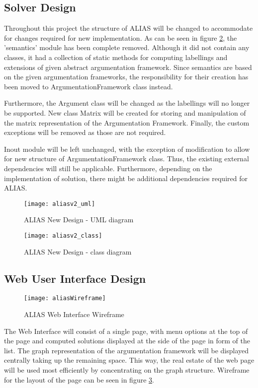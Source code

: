 \subsection{Solver Design}
Throughout this project the structure of ALIAS will be changed to accommodate for changes required for new implementation. As can be seen in figure \ref{fig:aliasUml2}, the 'semantics' module has been complete removed. Although it did not contain any classes, it had a collection of static methods for computing labellings and extensions of given abstract argumentation framework. Since semantics are based on the given argumentation frameworks, the responsibility for their creation has been moved to ArgumentationFramework class instead. 

Furthermore, the Argument class will be changed as the labellings will no longer be supported. New class Matrix will be created for storing and manipulation of the matrix representation of the Argumentation Framework. Finally, the custom exceptions will be removed as those are not required.

Inout module will be left unchanged, with the exception of modification to allow for new structure of ArgumentationFramework class. Thus, the existing external dependencies will still be applicable. Furthermore, depending on the implementation of solution, there might be additional dependencies required for ALIAS.

\begin{figure}[h]
	\texttt{[image: aliasv2\_uml]}
	\caption{ALIAS New Design - UML diagram}
	\label{fig:aliasUml2}
\end{figure}

\begin{figure}[h]
	\texttt{[image: aliasv2\_class]}
	\caption{ALIAS New Design - class diagram}
	\label{fig:aliasUml2}
\end{figure}

\subsection{Web User Interface Design}
\begin{figure}[h]
	\texttt{[image: aliasWireframe]}
	\caption{ALIAS Web Interface Wireframe}
	\label{fig:aliasWireframe}
\end{figure}
The Web Interface will consist of a single page, with menu options at the top of the page and computed solutions displayed at the side of the page in form of the list. The graph representation of the argumentation framework will be displayed centrally taking up the remaining space. This way, the real estate of the web page will be used most efficiently by concentrating on the graph structure. Wireframe for the layout of the page can be seen in figure \ref{fig:aliasWireframe}.



